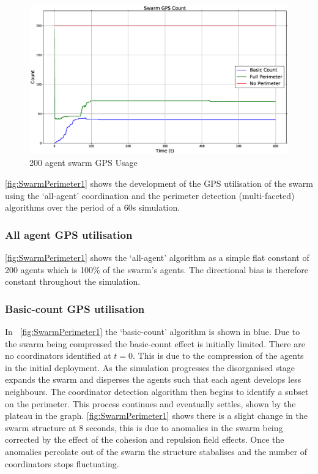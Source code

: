 \begin{figure}[H]
\begin{center}
\includegraphics[width=14cm]{CHAPTER-6/figures/SwarmPerimeter1}
\end{center}
\caption{200 agent swarm GPS Usage\label{fig:SwarmPerimeter1}}
\end{figure}

\autoref{fig:SwarmPerimeter1} shows the development of the GPS utilisation of the swarm using the `all-agent' coordination and the perimeter detection (multi-faceted) algorithms over the period of a 60s simulation. 

\subsubsection{All agent GPS utilisation\label{section:SwarmPerimeter2}}
\autoref{fig:SwarmPerimeter1} shows the `all-agent' algorithm as a simple flat constant of 200 agents which is 100\% of the swarm's agents. The directional bias is therefore constant throughout the simulation. 

\subsubsection{Basic-count GPS utilisation\label{section:SwarmPerimeter3}}
In ~\autoref{fig:SwarmPerimeter1} the `basic-count' algorithm is shown in blue. Due to the swarm being compressed the basic-count effect is initially limited. There are no coordinators identified at $t=0$. This is due to the compression of the agents in the initial deployment. As the simulation progresses the disorganised stage expands the swarm and disperses the agents such that each agent develops less neighbours. The coordinator detection algorithm then begins to identify a subset on the perimeter. This process continues and eventually settles, shown by the plateau in the graph.  \autoref{fig:SwarmPerimeter1} shows there is a slight change in the swarm structure at 8 seconds, this is due to anomalies in the swarm being corrected by the effect of the cohesion and repulsion field effects. Once the anomalies percolate out of the swarm the structure stabalises and the number of coordinators stops fluctuating.


